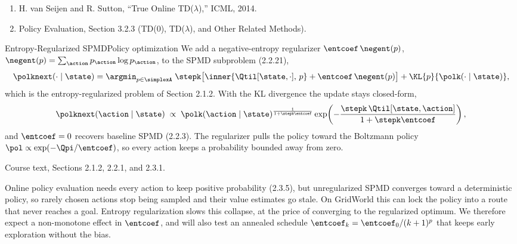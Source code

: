 \documentclass[11pt]{article}
\begin{document}

\begin{enumerate}[leftmargin=2em, topsep=0pt, itemsep=0pt, parsep=0pt]
    \item H. van Seijen and R. Sutton, ``True Online TD($\lambda$),'' ICML, 2014.
    \item Policy Evaluation, Section 3.2.3 (TD(0), TD($\lambda$), and Other Related Methods).
\end{enumerate}


\begin{enhancement}{Entropy-Regularized SPMD}{Policy optimization}
We add a negative-entropy regularizer $\entcoef\,\negent(p)$, $\negent(p) =
\sum_{\action} p_{\action} \log p_{\action}$, to the SPMD subproblem (2.2.21),
\[
  \polknext(\cdot \mid \state)
  = \argmin_{p \in \simplexA}\;
    \stepk\big[\inner{\Qtil[\state,\cdot],\, p} + \entcoef\,\negent(p)\big]
    + \KL{p}{\polk(\cdot \mid \state)},
\]
which is the entropy-regularized problem of Section 2.1.2. With the KL
divergence the update stays closed-form,
\[
  \polknext(\action \mid \state)
  \;\propto\;
  \polk(\action \mid \state)^{\frac{1}{1+\stepk\entcoef}}
  \exp\!\left(-\frac{\stepk\,\Qtil[\state,\action]}{1+\stepk\entcoef}\right),
\]
and $\entcoef = 0$ recovers baseline SPMD (2.2.3). The regularizer pulls the
policy toward the Boltzmann policy $\pol \propto \exp(-\Qpi/\entcoef)$, so
every action keeps a probability bounded away from zero.

Course text, Sections 2.1.2, 2.2.1, and 2.3.1.

Online policy evaluation needs every action to keep positive probability
(2.3.5), but unregularized SPMD converges toward a deterministic policy, so
rarely chosen actions stop being sampled and their value estimates go stale.
On GridWorld this can lock the policy into a route that never reaches a goal.
Entropy regularization slows this collapse, at the price of converging to the
regularized optimum. We therefore expect a non-monotone effect in $\entcoef$,
and will also test an annealed schedule $\entcoef_k = \entcoef_0/(k+1)^{p}$
that keeps early exploration without the bias.


\end{enhancement}
\end{document}
